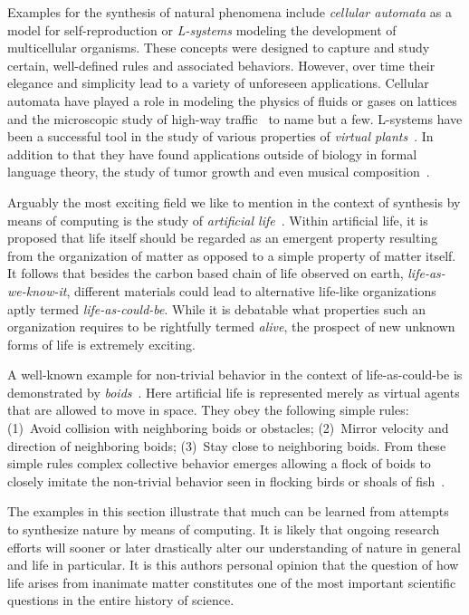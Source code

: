 		Examples for the synthesis of natural phenomena include \emph{cellular automata} as a model for self-reproduction or \emph{L-systems} modeling the development of multicellular organisms. These concepts were designed to capture and study certain, well-defined rules and associated behaviors. However, over time their elegance and simplicity lead to a variety of unforeseen applications. Cellular automata have played a role in modeling the physics of fluids or gases on lattices~\cite{rothman2004lattice} and the microscopic study of high-way traffic~\cite{nagel1998two} to name but a few. L-systems have been a successful tool in the study of various properties of \emph{virtual plants}~\cite{tardieu2003virtual}. In addition to that they have found applications outside of biology in formal language theory, the study of tumor growth and even musical composition~\cite{de2005natural}.

		Arguably the most exciting field we like to mention in the context of synthesis by means of computing is the study of \emph{artificial life}~\cite{Langton:1995:ALO:526815}. Within artificial life, it is proposed that life itself should be regarded as an emergent property resulting from the organization of matter as opposed to a simple property of matter itself. It follows that besides the carbon based chain of life observed on earth, \ie \emph{life-as-we-know-it}, different materials could lead to alternative life-like organizations aptly termed \emph{life-as-could-be}. While it is debatable what properties such an organization requires to be rightfully termed \emph{alive}, the prospect of new unknown forms of life is extremely exciting. 

		A well-known example for non-trivial behavior in the context of life-as-could-be is demonstrated by \emph{boids}~\cite{Reynolds:1987:FHS:37401.37406}. Here artificial life is represented merely as virtual agents that are allowed to move in space. They obey the following simple rules: (1)~Avoid collision with neighboring boids or obstacles; (2)~Mirror velocity and direction of neighboring boids; (3)~Stay close to neighboring boids. From these simple rules complex collective behavior emerges allowing a flock of boids to closely imitate the non-trivial behavior seen in flocking birds or shoals of fish~\cite{de2007fundamentals}.

		The examples in this section illustrate that much can be learned from attempts to synthesize nature by means of computing. It is likely that ongoing research efforts will sooner or later drastically alter our understanding of nature in general and life in particular. It is this authors personal opinion that the question of how life arises from inanimate matter constitutes one of the most important scientific questions in the entire history of science.

